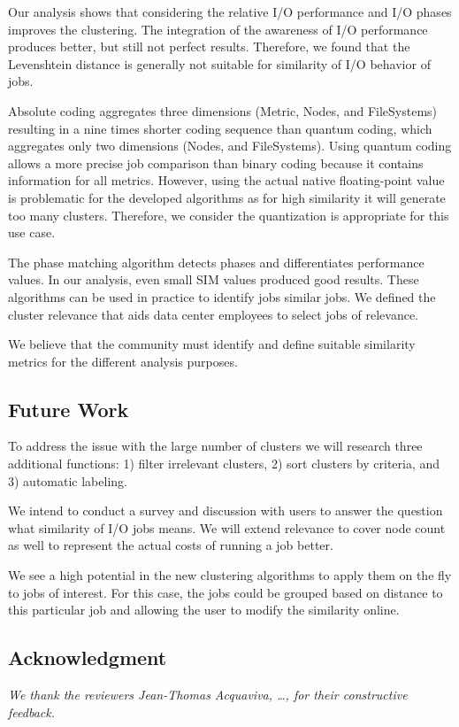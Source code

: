 \documentclass{jhps}
\begin{document}
{{{{Our analysis shows that considering the relative I/O performance and I/O phases improves the clustering.
The integration of the awareness of I/O performance produces better, but still not perfect results.
Therefore, we found that the Levenshtein distance is generally not suitable for similarity of I/O behavior of jobs.

Absolute coding aggregates three dimensions (Metric, Nodes, and FileSystems) resulting in a nine times shorter coding sequence than quantum coding, which aggregates only two dimensions (Nodes, and FileSystems).
Using quantum coding allows a more precise job comparison than binary coding because it contains information for all metrics.
However, using the actual native floating-point value is problematic for the developed algorithms as for high similarity it will generate too many clusters.
Therefore, we consider the quantization is appropriate for this use case.

The phase matching algorithm detects phases and differentiates performance values.
In our analysis, even small SIM values produced good results.
These algorithms can be used in practice to identify jobs similar jobs.
We defined the cluster relevance that aids data center employees to select jobs of relevance.

We believe that the community must identify and define suitable similarity metrics for the different analysis purposes.


\subsection{Future Work}
To address the issue with the large number of clusters we will research three additional functions: 1) filter irrelevant clusters, 2) sort clusters by criteria, and 3) automatic labeling.

We intend to conduct a survey and discussion with users to answer the question what similarity of I/O jobs means.
We will extend relevance to cover node count as well to represent the actual costs of running a job better.

We see a high potential in the new clustering algorithms to apply them on the fly to jobs of interest.
For this case, the jobs could be grouped based on distance to this particular job and allowing the user to modify the similarity online.


\subsection*{Acknowledgment} %
\textit{We thank the reviewers Jean-Thomas Acquaviva, …, for their constructive feedback.}

}}}}
\end{document}
